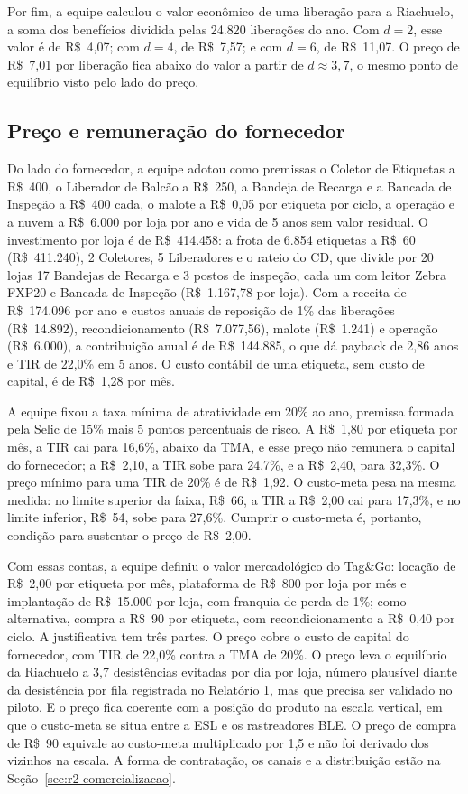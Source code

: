 Por fim, a equipe calculou o valor econômico de uma liberação para a Riachuelo, a soma dos benefícios dividida pelas 24.820 liberações do ano. Com $d = 2$, esse valor é de R\$~4,07; com $d = 4$, de R\$~7,57; e com $d = 6$, de R\$~11,07. O preço de R\$~7,01 por liberação fica abaixo do valor a partir de $d \approx 3{,}7$, o mesmo ponto de equilíbrio visto pelo lado do preço.

\subsection{Preço e remuneração do fornecedor}
\label{sub:r2-preco}

Do lado do fornecedor, a equipe adotou como premissas o Coletor de Etiquetas a R\$~400, o Liberador de Balcão a R\$~250, a Bandeja de Recarga e a Bancada de Inspeção a R\$~400 cada, o malote a R\$~0,05 por etiqueta por ciclo, a operação e a nuvem a R\$~6.000 por loja por ano e vida de 5 anos sem valor residual. O investimento por loja é de R\$~414.458: a frota de 6.854 etiquetas a R\$~60 (R\$~411.240), 2 Coletores, 5 Liberadores e o rateio do CD, que divide por 20 lojas 17 Bandejas de Recarga e 3 postos de inspeção, cada um com leitor Zebra FXP20 e Bancada de Inspeção (R\$~1.167,78 por loja). Com a receita de R\$~174.096 por ano e custos anuais de reposição de 1\% das liberações (R\$~14.892), recondicionamento (R\$~7.077,56), malote (R\$~1.241) e operação (R\$~6.000), a contribuição anual é de R\$~144.885, o que dá payback de 2,86 anos e TIR de 22,0\% em 5 anos. O custo contábil de uma etiqueta, sem custo de capital, é de R\$~1,28 por mês.

A equipe fixou a taxa mínima de atratividade em 20\% ao ano, premissa formada pela Selic de 15\% \cite{btg2025guararapes} mais 5 pontos percentuais de risco. A R\$~1,80 por etiqueta por mês, a TIR cai para 16,6\%, abaixo da TMA, e esse preço não remunera o capital do fornecedor; a R\$~2,10, a TIR sobe para 24,7\%, e a R\$~2,40, para 32,3\%. O preço mínimo para uma TIR de 20\% é de R\$~1,92. O custo-meta pesa na mesma medida: no limite superior da faixa, R\$~66, a TIR a R\$~2,00 cai para 17,3\%, e no limite inferior, R\$~54, sobe para 27,6\%. Cumprir o custo-meta é, portanto, condição para sustentar o preço de R\$~2,00.

Com essas contas, a equipe definiu o valor mercadológico do Tag\&Go: locação de R\$~2,00 por etiqueta por mês, plataforma de R\$~800 por loja por mês e implantação de R\$~15.000 por loja, com franquia de perda de 1\%; como alternativa, compra a R\$~90 por etiqueta, com recondicionamento a R\$~0,40 por ciclo. A justificativa tem três partes. O preço cobre o custo de capital do fornecedor, com TIR de 22,0\% contra a TMA de 20\%. O preço leva o equilíbrio da Riachuelo a 3,7 desistências evitadas por dia por loja, número plausível diante da desistência por fila registrada no Relatório 1, mas que precisa ser validado no piloto. E o preço fica coerente com a posição do produto na escala vertical, em que o custo-meta se situa entre a ESL e os rastreadores BLE. O preço de compra de R\$~90 equivale ao custo-meta multiplicado por 1,5 e não foi derivado dos vizinhos na escala. A forma de contratação, os canais e a distribuição estão na Seção~\ref{sec:r2-comercializacao}.

